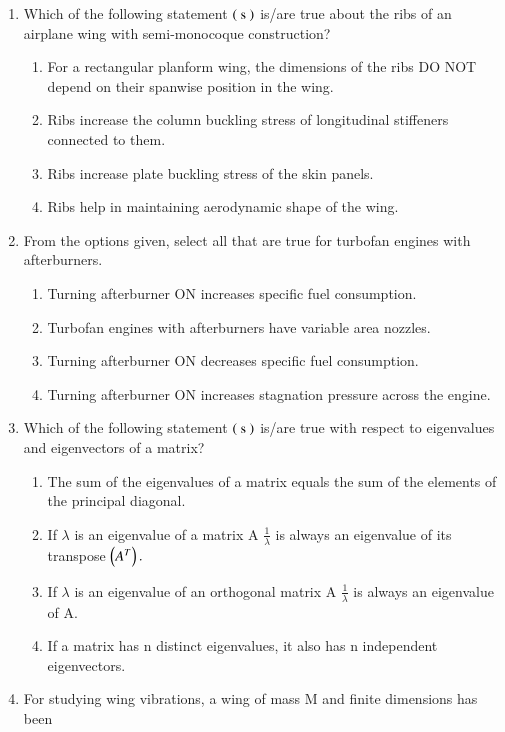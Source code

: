 \documentclass[journal]{IEEEtran}
\begin{document}
\begin{enumerate} [start=27]
\item Which of the following statement $\left(\text{ s }\right)$ is/are true about the ribs of an airplane wing with semi-monocoque construction?
\begin{enumerate}
    \item For a rectangular planform wing, the dimensions of the ribs DO NOT depend on their spanwise position in the wing.
    \item Ribs increase the column buckling stress of longitudinal stiffeners connected to them.
    \item Ribs increase plate buckling stress of the skin panels.
    \item Ribs help in maintaining aerodynamic shape of the wing.
\end{enumerate}
\bigskip
\item From the options given, select all that are true for turbofan engines with
afterburners. 
\begin{enumerate}
    \item Turning afterburner ON increases specific fuel consumption.
    \item Turbofan engines with afterburners have variable area nozzles.
    \item Turning afterburner ON decreases specific fuel consumption.
    \item Turning afterburner ON increases stagnation pressure across the engine.
\end{enumerate}
\bigskip
\item Which of the following statement $\left(\text{ s }\right)$ is/are true with respect to eigenvalues and eigenvectors of a matrix?
\begin{enumerate}
    \item The sum of the eigenvalues of a matrix equals the sum of the elements of the principal diagonal.
    \item If $\lambda$ is an eigenvalue of a matrix A $\frac{1}{\lambda}$ is always an eigenvalue of its transpose $\left(A^{T}\right).$
    \item If $\lambda$ is an eigenvalue of an orthogonal matrix A $\frac{1}{\lambda}$ is always an eigenvalue of  A.
    \item If a matrix has n distinct eigenvalues, it also has n independent eigenvectors. 
\end{enumerate}
\bigskip
\item For studying wing vibrations, a wing of mass M and finite dimensions has been

\end{enumerate}
\end{document}
